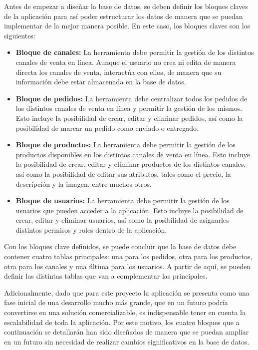 Antes de empezar a diseñar la base de datos, se deben definir los bloques claves de la aplicación para así poder estructurar los datos de manera que se puedan implementar de la mejor manera posible. En este caso, los bloques claves son los siguientes:

\begin{itemize}
    \item \textbf{Bloque de canales:} La herramienta debe permitir la gestión de los distintos canales de venta en línea. Aunque el usuario no crea ni edita de manera directa los canales de venta, interactúa con ellos, de manera que su información debe estar almacenada en la base de datos.
    \item \textbf{Bloque de pedidos:} La herramienta debe centralizar todos los pedidos de los distintos canales de venta en línea y permitir la gestión de los mismos. Esto incluye la posibilidad de crear, editar y eliminar pedidos, así como la posibilidad de marcar un pedido como enviado o entregado.
    \item \textbf{Bloque de productos:} La herramienta debe permitir la gestión de los productos disponibles en los distintos canales de venta en línea. Esto incluye la posibilidad de crear, editar y eliminar productos de los distintos canales, así como la posibilidad de editar sus atributos, tales como el precio, la descripción y la imagen, entre muchos otros.
    \item \textbf{Bloque de usuarios:} La herramienta debe permitir la gestión de los usuarios que pueden acceder a la aplicación. Esto incluye la posibilidad de crear, editar y eliminar usuarios, así como la posibilidad de asignarles distintos permisos y roles dentro de la aplicación.
\end{itemize}

Con los bloques clave definidos, se puede concluir que la base de datos debe contener cuatro tablas principales: una para los pedidos, otra para los productos, otra para los canales y una última para los usuarios. A partir de aquí, se pueden definir las distintas tablas que van a complementar las principales.

Adicionalmente, dado que para este proyecto la aplicación se presenta como una fase inicial de una desarrollo mucho más grande, que en un futuro podría convertirse en una solución comercializable, es indispensable tener en cuenta la escalabilidad de toda la aplicación. Por este motivo, los cuatro bloques que a continuación se detallarán han sido diseñados de manera que se puedan ampliar en un futuro sin necesidad de realizar cambios significativos en la base de datos.

